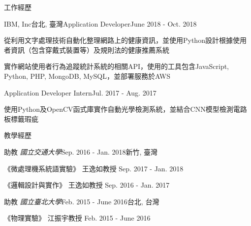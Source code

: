 \documentclass{resume} %
\begin{document}
\begin{rSection}{工作經歷}
    \begin{rSubsection}{IBM, Inc}{台北, 臺灣}{Application Developer}{June 2018 - Oct. 2018}
        \item 從利用文字處理技術自動化整理網路上的健康資訊，並使用Python設計根據使用者資訊（包含穿戴式裝置等）及規則法的健康推薦系統
        \item 實作網站使用者行為追蹤統計系統的相關API，使用的工具包含JavaScript, Python, PHP, MongoDB, MySQL，並部署服務於AWS
    \end{rSubsection}
    \begin{rSubsection2}{Application Developer Intern}{Jul. 2017 - Aug. 2017}
        \item 使用Python及OpenCV函式庫實作自動光學檢測系統，並結合CNN模型檢測電路板標籤瑕疵
    \end{rSubsection2}
\end{rSection}

\begin{rSection}{教學經歷}
    \begin{rSubsection}{助教 \it{國立交通大學}}{Sep. 2016 - Jan. 2018}{}{新竹, 臺灣}
        \item 《微處理機系統語實驗》 王逸如教授 \hfill Sep. 2017 - Jan. 2018
        \item 《邏輯設計與實作》 王逸如教授 \hfill Sep. 2016 - Jan. 2017
    \end{rSubsection}
    \begin{rSubsection}{助教 \it{國立臺北大學}}{Feb. 2015 - June 2016}{}{台北, 台灣}
        \item 《物理實驗》 江振宇教授 \hfill Feb. 2015 - June 2016
    \end{rSubsection}
\end{rSection}
\end{document}
